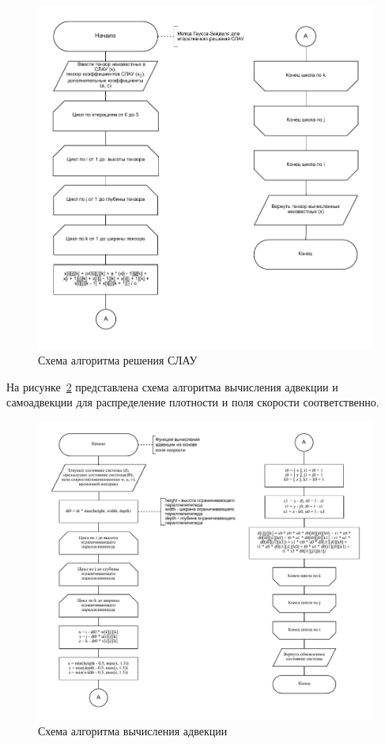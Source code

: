 \begin{figure}[H]
	\centering
	\includegraphics[width=1.0\textwidth,page=1]{assets/img/gauss-zeidel.pdf}
	\caption{Схема алгоритма решения СЛАУ}
	\label{fig:lin_solve}
\end{figure}

На рисунке~\ref{fig:advect} представлена схема алгоритма вычисления адвекции и самоадвекции для распределение плотности и поля скорости соответственно.


\begin{figure}[H]
	\centering
	\includegraphics[width=1.0\textwidth,page=1]{assets/img/advect.pdf}
	\caption{Схема алгоритма вычисления адвекции}
	\label{fig:advect}
\end{figure}

